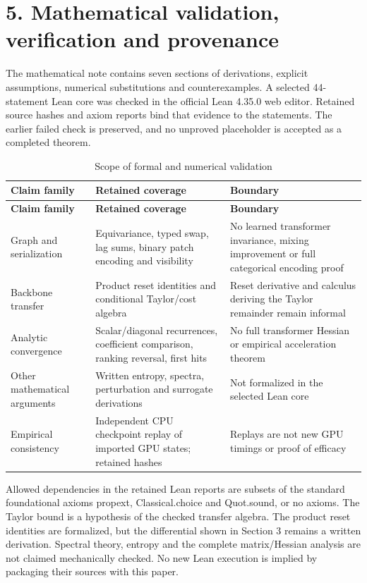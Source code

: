 \documentclass[11pt,a4paper]{article}
\begin{document}
\section*{5. Mathematical validation, verification and provenance}
The mathematical note contains seven sections of derivations, explicit assumptions, numerical substitutions and counterexamples. A selected 44-statement Lean core was checked in the official Lean 4.35.0 web editor. Retained source hashes and axiom reports bind that evidence to the statements. The earlier failed check is preserved, and no unproved placeholder is accepted as a completed theorem.

{\small
\begin{longtable}{>{\raggedright\arraybackslash}p{}>{\raggedright\arraybackslash}p{}>{\raggedright\arraybackslash}p{}}
\caption{Scope of formal and numerical validation}\\
\toprule
\textbf{Claim family} & \textbf{Retained coverage} & \textbf{Boundary} \\
\midrule\endfirsthead
\toprule
\textbf{Claim family} & \textbf{Retained coverage} & \textbf{Boundary} \\
\midrule\endhead
\bottomrule\endlastfoot
Graph and serialization & Equivariance, typed swap, lag sums, binary patch encoding and visibility & No learned transformer invariance, mixing improvement or full categorical encoding proof \\
Backbone transfer & Product reset identities and conditional Taylor/\allowbreak{}cost algebra & Reset derivative and calculus deriving the Taylor remainder remain informal \\
Analytic convergence & Scalar/\allowbreak{}diagonal recurrences, coefficient comparison, ranking reversal, first hits & No full transformer Hessian or empirical acceleration theorem \\
Other mathematical arguments & Written entropy, spectra, perturbation and surrogate derivations & Not formalized in the selected Lean core \\
Empirical consistency & Independent CPU checkpoint replay of imported GPU states; retained hashes & Replays are not new GPU timings or proof of efficacy \\
\end{longtable}
}
Allowed dependencies in the retained Lean reports are subsets of the standard foundational axioms propext, Classical.choice and Quot.sound, or no axioms. The Taylor bound is a hypothesis of the checked transfer algebra. The product reset identities are formalized, but the differential shown in Section 3 remains a written derivation. Spectral theory, entropy and the complete matrix/\allowbreak{}Hessian analysis are not claimed mechanically checked. No new Lean execution is implied by packaging their sources with this paper.
\end{document}

